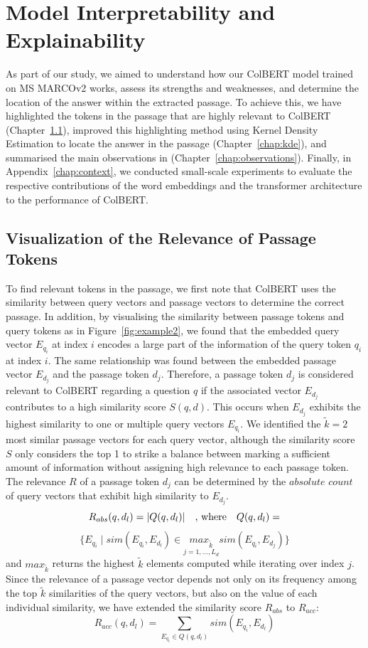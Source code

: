 \documentclass[11pt]{article}
\begin{document}
\section{Model Interpretability and Explainability}
\label{chap:understanding}
As part of our study, we aimed to understand how our ColBERT model trained on MS MARCOv2 works, assess its strengths and weaknesses, and determine the location of the answer within the extracted passage.
To achieve this, we have highlighted the tokens in the passage that are highly relevant to ColBERT (Chapter~\ref{chap:visualization}), improved this highlighting method using Kernel Density Estimation to locate the answer in the passage (Chapter~\ref{chap:kde}), and summarised the main observations in (Chapter~\ref{chap:observations}). 
Finally, in Appendix~\ref{chap:context}, we conducted small-scale experiments to evaluate the respective contributions of the word embeddings and the transformer architecture to the performance of ColBERT.

\subsection{Visualization of the Relevance of Passage Tokens}
\label{chap:visualization}
To find relevant tokens in the passage, we first note that ColBERT uses the similarity between query vectors and passage vectors to determine the correct passage.
In addition, by visualising the similarity between passage tokens and query tokens as in Figure~\ref{fig:example2}, we found that the embedded query vector $E_{q_i}$ at index $i$ encodes a large part of the information of the query token $q_i$ at index $i$. The same relationship was found between the embedded passage vector $E_{d_j}$ and the passage token $d_j$.
Therefore, a passage token $d_j$ is considered relevant to ColBERT regarding a question $q$ if the associated vector $E_{d_j}$ contributes to a high similarity score $S(q, d)$.
This occurs when $E_{d_j}$ exhibits the highest similarity to one or multiple query vectors $E_{q_i}$.
We identified the ${\tilde{k}}=2$ most similar passage vectors for each query vector, although the similarity score $S$ only considers the top 1 to strike a balance between marking a sufficient amount of information without assigning high relevance to each passage token. 
The relevance $R$ of a passage token $d_j$ can be determined by the $absolute$ $count$ of query vectors that exhibit high similarity to $E_{d_j}$. 
$$
    R_{abs}(q, d_l) = |Q(q, d_l)| \text{\quad, where\quad} Q(q, d_l) = 
$$
$$
  \{E_{q_i} \mid sim(E_{q_i}, E_{d_l}) \in \underset{j = 1, \dots, L_d}{max_{\tilde{k}}} sim(E_{q_i}, E_{d_j})\}
$$
and $max_{\tilde{k}}$ returns the highest ${\tilde{k}}$ elements computed while iterating over index $j$.
Since the relevance of a passage vector depends not only on its frequency among the top ${\tilde{k}}$ similarities of the query vectors, but also on the value of each individual similarity, we have extended the similarity score $R_{abs}$ to $R_{acc}$:
$$
	R_{acc}(q, d_l) = \sum_{E_{q_i} \in Q(q, d_l)} sim(E_{q_i}, E_{d_l}) 
$$
\end{document}
